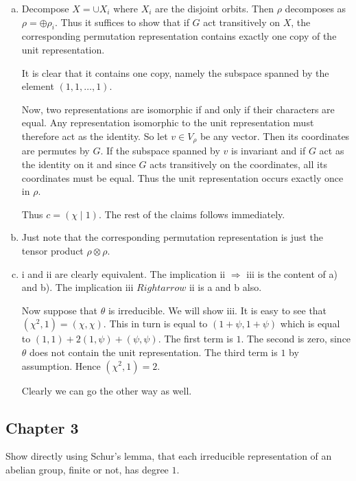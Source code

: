 \documentclass[11pt, english]{article}
\begin{document}
\begin{sol}
  \begin{enumerate}[a)]
  \item 
Decompose $X= \cup X_i$ where $X_i$ are the disjoint orbits. Then $\rho$ decomposes as $\rho=\oplus \rho_i$. Thus it suffices to show that if $G$ act transitively on $X$, the corresponding permutation representation contains exactly one copy of the unit representation.

It is clear that it contains one copy, namely the subspace spanned by the element $(1,1,\ldots,1)$.

Now, two representations are isomorphic if and only if their characters are equal. Any representation isomorphic to the unit representation must therefore act as the identity. So let $v \in V_\rho$ be any vector. Then its coordinates are permutes by $G$. If the subspace spanned by $v$ is invariant and if $G$ act as the identity on it and since $G$ acts transitively on the coordinates, all its coordinates must be equal. Thus the unit representation occurs exactly once in $\rho$. 

Thus $c= (\chi \mid 1)$. The rest of the claims follows immediately.
\item Just note that the corresponding permutation representation is just the tensor product $\rho \otimes \rho$. 
\item i and ii are clearly equivalent. The implication ii $\Rightarrow$ iii is the content of a) and b). The implication iii $Rightarrow$ ii is a and b also. 

Now suppose that $\theta$ is irreducible. We will show iii. It is easy to see that $(\chi^2,1)=(\chi, \chi)$. This in turn is equal to $(1+\psi,1+\psi)$ which is equal to $(1,1)+2(1,\psi)+(\psi,\psi)$. The first term is $1$. The second is zero, since $\theta$ does not contain the unit representation. The third term is $1$ by assumption. Hence $(\chi^2,1)=2$. 

Clearly we can go the other way as well.
  \end{enumerate}
\end{sol}

\subsection{Chapter 3}

\begin{exc}[Exercise 3.1]
 Show directly using Schur's lemma, that each irreducible representation of an abelian group, finite or not, has degree $1$.
\end{exc}
\end{document}
